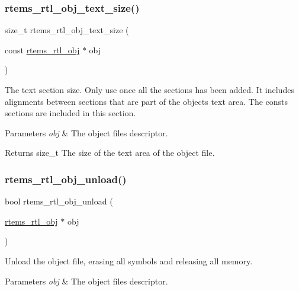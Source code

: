 \subsubsection{\texorpdfstring{rtems\_rtl\_obj\_text\_size()}{rtems\_rtl\_obj\_text\_size()}}
{\footnotesize\ttfamily size\+\_\+t rtems\+\_\+rtl\+\_\+obj\+\_\+text\+\_\+size (\begin{DoxyParamCaption}\item[{const \mbox{\hyperlink{structrtems__rtl__obj}{rtems\+\_\+rtl\+\_\+obj}} $\ast$}]{obj }\end{DoxyParamCaption})}

The text section size. Only use once all the sections has been added. It includes alignments between sections that are part of the object\textquotesingle{}s text area. The consts sections are included in this section.


\begin{DoxyParams}{Parameters}
{\em obj} & The object file\textquotesingle{}s descriptor. \\
\hline
\end{DoxyParams}
\begin{DoxyReturn}{Returns}
size\+\_\+t The size of the text area of the object file. 
\end{DoxyReturn}
\mbox{\label{rtl-obj_8h_a8c0debf8dbf88e9eac3f24357473b1bc}} 
\subsubsection{\texorpdfstring{rtems\_rtl\_obj\_unload()}{rtems\_rtl\_obj\_unload()}}
{\footnotesize\ttfamily bool rtems\+\_\+rtl\+\_\+obj\+\_\+unload (\begin{DoxyParamCaption}\item[{\mbox{\hyperlink{structrtems__rtl__obj}{rtems\+\_\+rtl\+\_\+obj}} $\ast$}]{obj }\end{DoxyParamCaption})}

Unload the object file, erasing all symbols and releasing all memory.


\begin{DoxyParams}{Parameters}
{\em obj} & The object file\textquotesingle{}s descriptor. \\
\hline
\end{DoxyParams}

